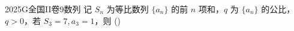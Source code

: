 
\begin{problem}{2025}{G}{全国II卷}{9}{数列}
记 $S_n$ 为等比数列 $\{a_n\}$ 的前 $n$ 项和，$q$ 为 $\{a_n\}$ 的公比，$q>0$，若 $S_3=7, a_3=1$，则
(\hspace{1cm})
\begin{choices}
\end{choices}
\end{problem}